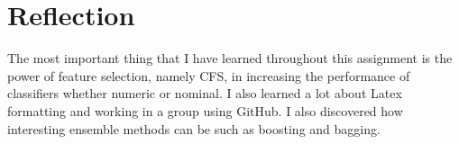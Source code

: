 \section{Reflection}


The most important thing that I have learned throughout this assignment is the power of feature selection, namely CFS, in increasing the performance of classifiers whether numeric or nominal. I also learned a lot about Latex formatting and working in a group using GitHub. I also discovered how interesting ensemble methods can be such as boosting and bagging.
